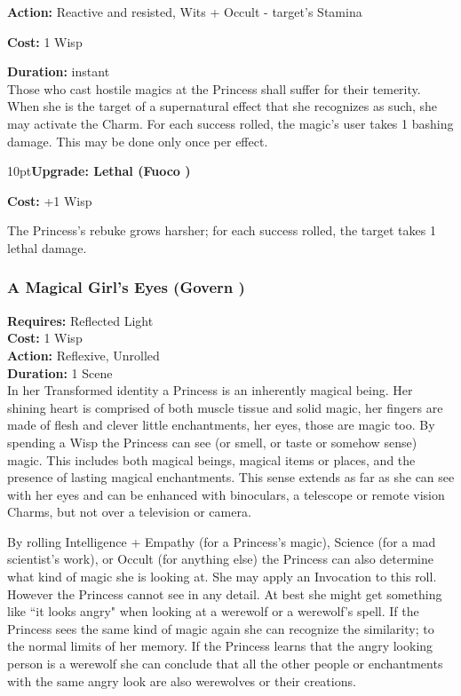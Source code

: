 \noindent \textbf{Action:} Reactive and resisted, Wits + Occult - target's Stamina

\noindent \textbf{Cost:} 1 Wisp

\noindent \textbf{Duration:} instant\\

\noindent Those who cast hostile magics at the Princess shall suffer for their temerity. When she is the target of a supernatural effect that she recognizes as such, she may activate the Charm. For each success rolled, the magic's user takes 1 bashing damage. This may be done only once per effect. 

\begin{myindentpar}{10pt}\textbf{Upgrade: Lethal (Fuoco \textbullet\textbullet)}

\noindent \textbf{Cost:} +1 Wisp

The Princess's rebuke grows harsher; for each success rolled, the target takes 1 lethal damage.\end{myindentpar}

\subsubsection*{A Magical Girl's Eyes (Govern \textbullet\textbullet\textbullet)}

\noindent \textbf{Requires:} Reflected Light\\

\noindent \textbf{Cost:} 1 Wisp\\

\noindent \textbf{Action:} Reflexive, Unrolled\\

\noindent \textbf{Duration:} 1 Scene\\

\noindent In her Transformed identity a Princess is an inherently magical being. Her shining heart is comprised of both muscle tissue and solid magic, her fingers are made of flesh and clever little enchantments, her eyes, those are magic too. By spending a Wisp the Princess can see (or smell, or taste or somehow sense) magic. This includes both magical beings, magical items or places, and the presence of lasting magical enchantments. This sense extends as far as she can see with her eyes and can be enhanced with binoculars, a telescope or remote vision Charms, but not over a television or camera.

By rolling Intelligence + Empathy (for a Princess's magic), Science (for a mad scientist's work), or Occult (for anything else) the Princess can also determine what kind of magic she is looking at. She may apply an Invocation to this roll. However the Princess cannot see in any detail. At best she might get something like \textquotedblleft it looks angry" when looking at a werewolf or a werewolf's spell. If the Princess sees the same kind of magic again she can recognize the similarity; to the normal limits of her memory. If the Princess learns that the angry looking person is a werewolf she can conclude that all the other people or enchantments with the same angry look are also werewolves or their creations.

